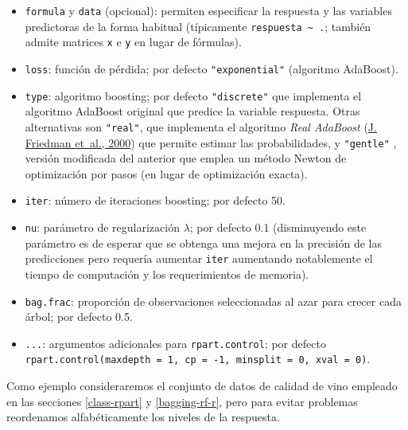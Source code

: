 \documentclass[
  spanish,
]{book}
\theoremstyle{break}
\theoremstyle{definition}
\theoremstyle{definition}
\theoremstyle{definition}
\theoremstyle{definition}
\theoremstyle{remark}
\begin{document}
\begin{itemize}
\item
  \texttt{formula} y \texttt{data} (opcional): permiten especificar la respuesta y las variables predictoras de la forma habitual (típicamente \texttt{respuesta\ \textasciitilde{}\ .}; también admite matrices \texttt{x} e \texttt{y} en lugar de fórmulas).
\item
  \texttt{loss}: función de pérdida; por defecto \texttt{"exponential"} (algoritmo AdaBoost).
\item
  \texttt{type}: algoritmo boosting; por defecto \texttt{"discrete"} que implementa el algoritmo AdaBoost original que predice la variable respuesta. Otras alternativas son \texttt{"real"}, que implementa el algoritmo \emph{Real AdaBoost} (\protect\hyperlink{ref-friedman2000additive}{J. Friedman et~al., 2000}) que permite estimar las probabilidades, y \texttt{"gentle"} , versión modificada del anterior que emplea un método Newton de optimización por pasos (en lugar de optimización exacta).
\item
  \texttt{iter}: número de iteraciones boosting; por defecto 50.
\item
  \texttt{nu}: parámetro de regularización \(\lambda\); por defecto 0.1 (disminuyendo este parámetro es de esperar que se obtenga una mejora en la precisión de las predicciones pero requería aumentar \texttt{iter} aumentando notablemente el tiempo de computación y los requerimientos de memoria).
\item
  \texttt{bag.frac}: proporción de observaciones seleccionadas al azar para crecer cada árbol; por defecto 0.5.
\item
  \texttt{...}: argumentos adicionales para \texttt{rpart.control}; por defecto \texttt{rpart.control(maxdepth\ =\ 1,\ cp\ =\ -1,\ minsplit\ =\ 0,\ xval\ =\ 0)}.
\end{itemize}

Como ejemplo consideraremos el conjunto de datos de calidad de vino empleado en las secciones \ref{class-rpart} y \ref{bagging-rf-r}, pero para evitar problemas reordenamos alfabéticamente los niveles de la respuesta.
\end{document}
